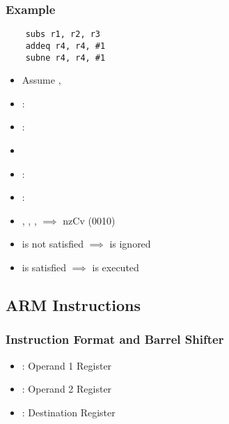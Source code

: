 \subsubsection*{Example}
\linespread{1.1}
\begin{verbatim}
    subs r1, r2, r3
    addeq r4, r4, #1
    subne r4, r4, #1
\end{verbatim}
\linespread{1.6}
\begin{itemize}
    \item Assume , 
    \item {}: 
    \item {}: 
    \item {}
    \item {}: 
    \item {}: 
    \item {}, , ,  $\implies$ nzCv (0010)
    \item {} is not satisfied $\implies$  is ignored
    \item {} is satisfied $\implies$  is executed
\end{itemize}

\subsection{ARM Instructions}

\subsubsection*{Instruction Format and Barrel Shifter}
\begin{itemize}
    \item {}: Operand 1 Register
    \item {}: Operand 2 Register
    \item {}: Destination Register
\end{itemize}


